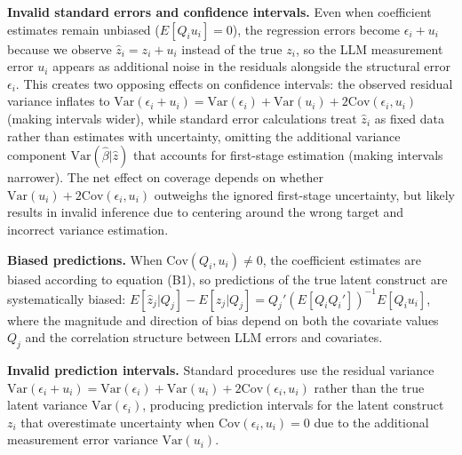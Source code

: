 \documentclass[11pt]{article}
\begin{document}
\textbf{Invalid standard errors and confidence intervals.} Even when coefficient estimates remain unbiased ($E[Q_i u_i] = 0$), 
the regression errors become $\epsilon_i + u_i$ because we observe $\hat{z}_i = z_i + u_i$ instead of the true $z_i$, 
so the LLM measurement error $u_i$ appears as additional noise in the residuals alongside the structural error $\epsilon_i$. 
This creates two opposing effects on confidence intervals: the observed residual variance 
inflates to $\text{Var}(\epsilon_i + u_i) = \text{Var}(\epsilon_i) + \text{Var}(u_i) + 2\text{Cov}(\epsilon_i, u_i)$ (making intervals wider), 
while standard error calculations treat $\hat{z}_i$ as fixed data rather than estimates with uncertainty,
omitting the additional variance component $\text{Var}(\hat{\beta} | \hat{z})$ that accounts for first-stage estimation (making intervals narrower). 
The net effect on coverage depends on whether $\text{Var}(u_i) + 2\text{Cov}(\epsilon_i, u_i)$ outweighs the ignored first-stage uncertainty,
but likely results in invalid inference due to centering around the wrong target and incorrect variance estimation.

\textbf{Biased predictions.} When $\text{Cov}(Q_i, u_i) \neq 0$, the coefficient estimates are biased according to equation (B1), 
so predictions of the true latent construct are systematically biased: $E[\hat{z}_j | Q_j] - E[z_j | Q_j] = Q_j'(E[Q_i Q_i'])^{-1} E[Q_i u_i]$, 
where the magnitude and direction of bias depend on both the covariate values $Q_j$ and the correlation structure between LLM errors and covariates.

\textbf{Invalid prediction intervals.} Standard procedures use the residual variance 
$\text{Var}(\epsilon_i + u_i) = \text{Var}(\epsilon_i) + \text{Var}(u_i) + 2\text{Cov}(\epsilon_i, u_i)$ 
rather than the true latent variance $\text{Var}(\epsilon_i)$, producing prediction intervals 
for the latent construct $z_i$ that overestimate uncertainty when $\text{Cov}(\epsilon_i, u_i) = 0$ due 
to the additional measurement error variance $\text{Var}(u_i)$.
\end{document}
